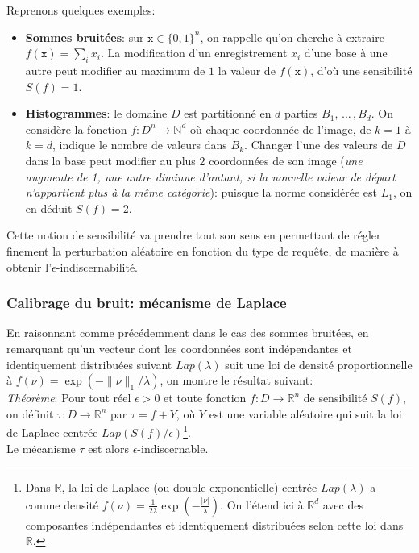 \documentclass[a4paper,11pt]{article} %
\begin{document}
Reprenons quelques exemples:
\begin{itemize}
    \item 
    \textbf{Sommes bruitées}: sur $\mathtt{x}\in\{0,1\}^n$, on rappelle qu'on cherche à extraire $f(\mathtt{x})=\sum_i{x_i}$. La modification d'un enregistrement $x_i$ d'une base à une autre peut modifier au maximum de $1$ la valeur de  $f(\mathtt{x})$, d'où une sensibilité $S(f)=1$.
    \item 
    \textbf{Histogrammes}: le domaine $D$ est partitionné en $d$ parties $B_1,\,\ldots\,, B_d$. On considère la fonction $f:D^n\longrightarrow\mathbb{N}^d$ où chaque coordonnée de l'image, de $k=1$ à $k=d$, indique le nombre de valeurs dans $B_k$. Changer l'une des valeurs de $D$ dans la base peut modifier au plus $2$ coordonnées de son image (\emph{une augmente de 1, une autre diminue d'autant, si la nouvelle valeur de départ n'appartient plus à la même catégorie}): puisque la norme considérée est $L_1$, on en déduit $S(f)=2$.
\end{itemize}

Cette notion de sensibilité va prendre tout son sens en permettant de régler finement la perturbation aléatoire en fonction du type de requête, de manière à obtenir l'$\epsilon$-indiscernabilité.
%
\subsubsection{Calibrage du bruit: mécanisme de Laplace}%
%
En raisonnant comme précédemment dans le cas des sommes bruitées, en remarquant qu'un vecteur dont les coordonnées sont indépendantes et identiquement distribuées suivant $Lap(\lambda)$ suit une loi de densité proportionnelle à $f(\nu)=\exp(-\|\nu\|_1/\lambda)$, on montre le résultat suivant:\\[-0.4em]

\emph{Théorème}: Pour tout réel $\epsilon>0$ et toute fonction $f:D\longrightarrow\mathbb{R}^n$ de sensibilité $S(f)$, on définit  $\tau:D\longrightarrow\mathbb{R}^n$ par $\tau=f+Y$, où $Y$ est une variable aléatoire qui suit la loi de Laplace centrée $Lap\left(S(f)/\epsilon\right)$\footnote{Dans $\mathbb{R}$, la loi de Laplace (ou \og double exponentielle\fg{}) centrée $Lap(\lambda)$ a comme densité $f(\nu)=\frac{1}{2\lambda}\exp(-\frac{| \nu|}{\lambda})$. On l'étend ici à $\mathbb{R}^d$ avec des composantes indépendantes et identiquement distribuées selon cette loi dans $\mathbb{R}$.}.\\
Le mécanisme $\tau$ est alors $\epsilon$-indiscernable.\\[-0.4em]
\end{document}
